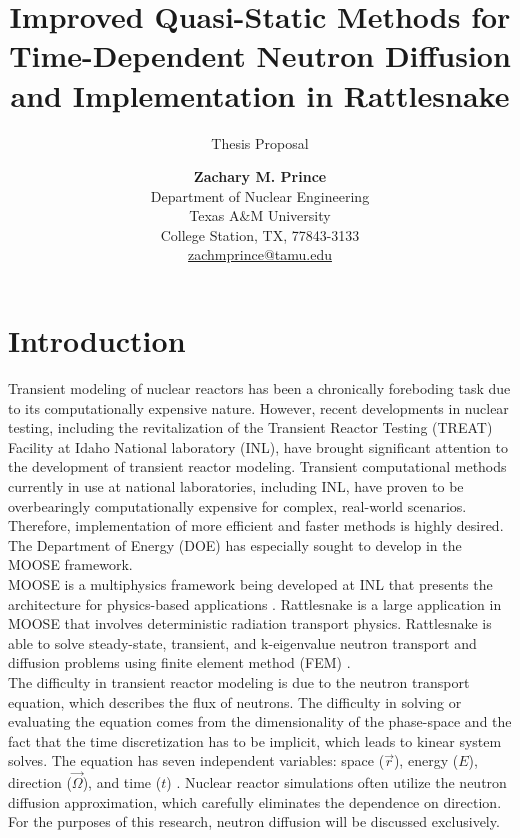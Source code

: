 \documentclass[12pt]{scrartcl}
\title{\normalfont \LARGE Improved Quasi-Static Methods for Time-Dependent Neutron Diffusion and Implementation in Rattlesnake}
\subtitle{\normalfont Thesis Proposal}
\author{ \normalsize
  \textbf{Zachary M. Prince} \\ \vspace{-3mm}
 \normalsize Department of Nuclear Engineering \\ \vspace{-3mm}
 \normalsize Texas A\&M University\\ \vspace{-3mm}
 \normalsize College Station, TX, 77843-3133\\
 \normalsize \href{mailto:zachmprince@tamu.edu}{zachmprince@tamu.edu}
}
\begin{document}
\maketitle
{}

\section{Introduction}
\label{sect:introduction}

Transient modeling of nuclear reactors has been a chronically foreboding task due to its computationally expensive nature.  However, recent developments in nuclear testing, including the revitalization of the Transient Reactor Testing (TREAT) Facility at Idaho National laboratory (INL), have brought significant attention to the development of transient reactor modeling.  Transient computational methods currently in use at national laboratories, including INL, have proven to be overbearingly computationally expensive for complex, real-world scenarios.  Therefore, implementation of more efficient and faster methods is highly desired.  The Department of Energy (DOE) has especially sought to develop in the MOOSE framework.  \\

MOOSE is a multiphysics framework being developed at INL that presents the architecture for physics-based applications \cite{moose}.  Rattlesnake is a large application in MOOSE that involves deterministic radiation transport physics.  Rattlesnake is able to solve steady-state, transient, and k-eigenvalue neutron transport and diffusion problems using finite element method (FEM) \cite{wang2013}. \\

The difficulty in transient reactor modeling is due to the neutron transport equation, which describes the flux of neutrons. The difficulty in solving or evaluating the equation comes from the dimensionality of the phase-space and the fact that the time discretization has to be implicit, which  leads to kinear system solves.  The equation has seven independent variables: space ($\vec{r}$), energy ($E$), direction ($\vec{\Omega}$), and time ($t$) \cite{duderstadt1976nuclear}.  Nuclear reactor simulations often utilize the neutron diffusion approximation, which carefully eliminates the dependence on direction.  For the purposes of this research, neutron diffusion will be discussed exclusively. \\
\end{document}
